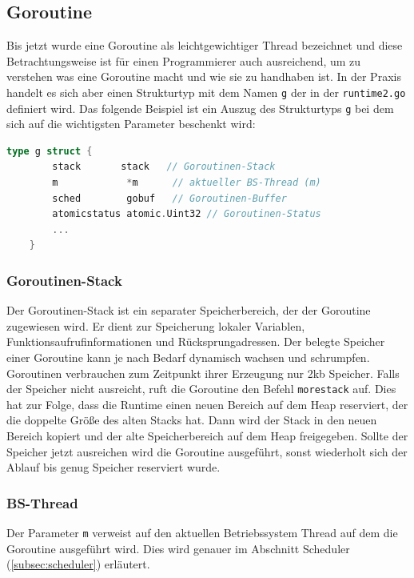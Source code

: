 \documentclass[fontsize=12pt,paper=a4,twoside=semi,parskip=half-,headsepline,headinclude]{scrreprt}
\begin{document}
\subsection{Goroutine}

Bis jetzt wurde eine Goroutine als leichtgewichtiger Thread bezeichnet und diese Betrachtungsweise ist für einen Programmierer auch ausreichend, um zu verstehen was eine Goroutine macht und wie sie zu handhaben ist. In der Praxis handelt es sich aber einen Strukturtyp mit dem Namen \texttt{g} der in der \texttt{runtime2.go} \cite{goruntime2024} definiert wird. Das folgende Beispiel ist ein Auszug des Strukturtyps \texttt{g} bei dem sich auf die wichtigsten Parameter beschenkt wird:

\begin{lstlisting}[language=Go,extendedchars=true]
	type g struct {
		stack	    stack   // Goroutinen-Stack
		m       	 *m      // aktueller BS-Thread (m)
		sched   	 gobuf   // Goroutinen-Buffer
		atomicstatus atomic.Uint32 // Goroutinen-Status
		...
	}
\end{lstlisting}

\subsubsection{Goroutinen-Stack}

 Der Goroutinen-Stack ist ein separater Speicherbereich, der der Goroutine zugewiesen wird. Er dient zur Speicherung lokaler Variablen, Funktionsaufrufinformationen und Rücksprungadressen. Der belegte Speicher einer Goroutine kann je nach Bedarf dynamisch wachsen und schrumpfen. Goroutinen verbrauchen zum Zeitpunkt ihrer Erzeugung nur 2kb Speicher. Falls der Speicher nicht ausreicht, ruft die Goroutine den Befehl \texttt{morestack} auf. Dies hat zur Folge, dass die Runtime einen neuen Bereich auf dem Heap reserviert, der die doppelte Größe des alten Stacks hat. Dann wird der Stack in den neuen Bereich kopiert und der  alte Speicherbereich auf dem Heap freigegeben. Sollte der Speicher jetzt ausreichen wird die Goroutine ausgeführt, sonst wiederholt sich der Ablauf bis genug Speicher reserviert wurde.
 
\subsubsection{BS-Thread}
 Der Parameter \texttt{m} verweist auf den aktuellen Betriebssystem Thread auf dem die Goroutine ausgeführt wird. Dies wird genauer im Abschnitt Scheduler (\ref{subsec:scheduler}) erläutert.
\end{document}
